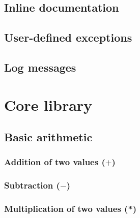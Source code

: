 \documentclass{article}
\theoremstyle{definition}
\begin{document}
\hypertarget{hsec:inline-doc}{}
\subsection{Inline documentation}
\label{sec:inline-doc}


\hypertarget{hsec:exception-form}{}
\subsection{User-defined exceptions}
\label{sec:exception-form}


\hypertarget{hsec:logs}{}
\subsection{Log messages}
\label{sec:logs}


\pagebreak

\section{Core library}

\subsection{Basic arithmetic}

\subsubsection{Addition of two values ($+$)}

\subsubsection{Subtraction ($-$)}

\subsubsection{Multiplication of two values (*)}
\end{document}
